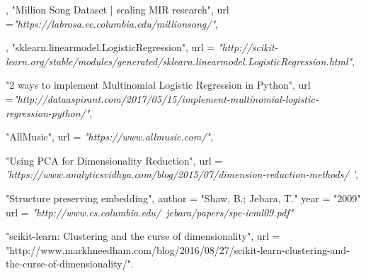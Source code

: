 \documentclass[journal]{IEEEtran}
\begin{document}
\begin{thebibliography}{1}
	
	,
	"Million Song Dataset | scaling MIR research",
	url =\textit{"https://labrosa.ee.columbia.edu/millionsong/"},
	
	,
	"sklearn.linearmodel.LogisticRegression",
	url = \textit{"http://scikit-learn.org/stable/modules/generated/sklearn.linearmodel.LogisticRegression.html"},

	"2 ways to implement Multinomial Logistic Regression in Python",
	url =\textit{"http://dataaspirant.com/2017/05/15/implement-multinomial-logistic-regression-python/"},
	
	"AllMusic",
	url = \textit{"https://www.allmusic.com/"},

	"Using PCA for Dimensionality Reduction",
	url = \textit{'https://www.analyticsvidhya.com/blog/2015/07/dimension-reduction-methods/ '},
	
	"Structure preserving embedding",
	author = "Shaw, B.; Jebara, T."
	year = "2009"
	url = \textit{"http://www.cs.columbia.edu/~jebara/papers/spe-icml09.pdf"}
	
	"scikit-learn: Clustering and the curse of dimensionality",
	url = "http://www.markhneedham.com/blog/2016/08/27/scikit-learn-clustering-and-the-curse-of-dimensionality/".
	
\end{thebibliography}

\newpage
\end{document}
